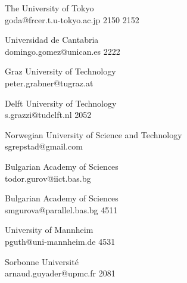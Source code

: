 \begin{multicols}{2}
 {The University of Tokyo\\}%
 {goda@frcer.t.u-tokyo.ac.jp}%
 {2150} %
 {2152} %
 {} %
 {} %
 {} %

 {Universidad de Cantabria\\}%
 {domingo.gomez@unican.es}%
 {2222} %
 {} %
 {} %
 {} %
 {} %

 {Graz University of Technology\\}%
 {peter.grabner@tugraz.at}%
 {} %
 {} %
 {} %
 {} %
 {} %

 {Delft University of Technology\\}%
 {s.grazzi@tudelft.nl}%
 {2052} %
 {} %
 {} %
 {} %
 {} %

 {Norwegian University of Science and Technology\\}%
 {sgrepstad@gmail.com}%
 {} %
 {} %
 {} %
 {} %
 {} %

 {Bulgarian Academy of Sciences\\}%
 {todor.gurov@iict.bas.bg}%
 {} %
 {} %
 {} %
 {} %
 {} %

 {Bulgarian Academy of Sciences\\}%
 {smgurova@parallel.bas.bg}%
 {4511} %
 {} %
 {} %
 {} %
 {} %

 {University of Mannheim\\}%
 {pguth@uni-mannheim.de}%
 {4531} %
 {} %
 {} %
 {} %
 {} %

 {Sorbonne Universit\'e\\}%
 {arnaud.guyader@upmc.fr}%
 {2081} %
 {} %
 {} %
 {} %
 {} %


\end{multicols}
